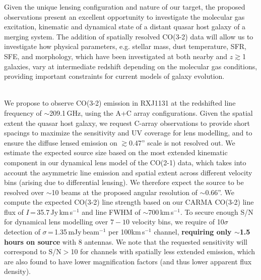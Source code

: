 \documentclass[11pt,a4paper,twoside,graphicx,color]{article}
\newcommand{\bco}{\mbox{CO(2-1)}\xspace}
\newcommand{\cco}{\mbox{CO(3-2)}\xspace}
\newcommand{\kms}{km\,s$^{-1}$\xspace}
\newcommand{\pmOne}{\mbox{$^{-1}$}\xspace}
\newcommand{\eq}{\,=\,}
\newcommand{\SF}{star formation\xspace}
\newcommand{\atinterz}{at intermediate redshift\xspace}
\newcommand{\obs}{observations\xspace}
\begin{document}
Given the unique lensing configuration and nature of our target, the proposed observations 
present an excellent opportunity to investigate the molecular gas excitation, kinematic and dynamical 
state of a distant quasar host galaxy of a merging system.
The addition of spatially resolved \cco data will allow 
us to investigate how physical parameters, e.g. stellar mass, dust temperature, SFR, SFE, and morphology, which have been investigated at both nearby and $z$$\gtrsim$1 galaxies, vary \atinterz depending on the molecular gas conditions, providing important constraints for current models of galaxy evolution.


\vspace{.3em}
 \\
\indent 
We propose to observe \cco emission in RXJ1131 at the redshifted line frequency of $\sim$209.1\,GHz, using the A+C array configurations. 
Given the spatial extent the quasar host galaxy, 
we request C-array \obs to provide short spacings 
to maximize the sensitivity and UV coverage for lens modelling, and to
ensure the diffuse lensed emission on $\gtrsim$0.47'' scale is not resolved out. %
We estimate the expected source size based on the
most extended kinematic component in our dynamical lens model of the \bco data, which takes into account the asymmetric line emission and spatial extent across different velocity bins (arising due to differential lensing).
We therefore expect the source to be resolved over $\sim$10 beams at the proposed angular resolution of $\sim$0.66''.
We compute the expected \cco line strength based on our 
CARMA \cco line flux of $I$\eq35.7\,Jy\,\kms and line FWHM of $\sim$700\,\kms.
To secure enough S/N for dynamical lens modelling over $7-10$ velocity bins, 
we require of 10$\sigma$ detection of $\sigma$\eq1.35\,mJy\,beam\pmOne per 100\kms channel,
{\bf requiring only $\sim$1.5 hours on source} with 8 antennas.
We note that the requested sensitivity will correspond to S/N$>$10 for channels with spatially less extended emission, which are also found to have lower magnification factors (and thus lower apparent flux density). 
\end{document}
